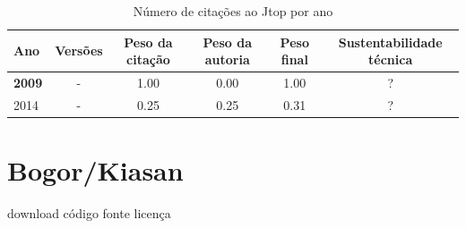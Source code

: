 \begin{table}[H]
\caption{Número de citações ao Jtop por ano}
\centering
\begin{tabular}{| l | c | c | c | c | c |}
  \hline
  Ano & Versões & Peso da citação & Peso da autoria & Peso final & Sustentabilidade técnica \\
  \hline
            {\bf 2009}
          &
          -
          &
          1.00
          &
          0.00
          &
            {\color{blue} 1.00}
          &
          ?
          \\
\hline
            2014
          &
          -
          &
          0.25
          &
          0.25
          &
            {\color{red} 0.31}
          &
          ?
          \\
\hline
\end{tabular}
\end{table}



\section{Bogor/Kiasan}
\checkmark download
\checkmark código fonte
\checkmark licença



